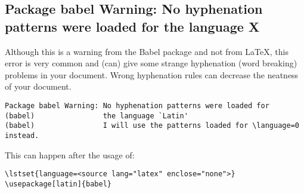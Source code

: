 \subsection{Package babel Warning: No hyphenation patterns were loaded for the language X}
Although this is a warning from the Babel package and not from LaTeX, this
error is very common and (can) give some strange hyphenation (word breaking)
problems in your document. Wrong hyphenation rules can decrease the neatness of
your document.
\begin{verbatim}
Package babel Warning: No hyphenation patterns were loaded for
(babel)                the language `Latin'
(babel)                I will use the patterns loaded for \language=0 instead.
\end{verbatim}

This can happen after the usage of: 
\begin{lstlisting}
\lstset{language=<source lang="latex" enclose="none">}
\usepackage[latin]{babel}
\end{lstlisting}

